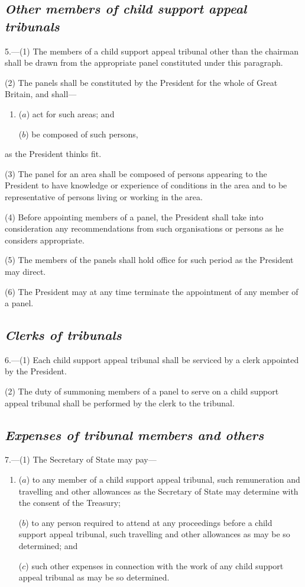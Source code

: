 \documentclass[12pt,a4paper]{article}
\begin{document}
\subsection*{\itshape Other members of child support appeal tribunals}

5.---(1) The members of a child support appeal tribunal other than the chairman shall be drawn from the appropriate panel constituted under this paragraph.

(2) The panels shall be constituted by the President for the whole of Great Britain, and shall—
\begin{enumerate}\item[]
($a$) act for such areas; and

($b$) be composed of such persons,
\end{enumerate}
as the President thinks fit.

(3) The panel for an area shall be composed of persons appearing to the President to have knowledge or experience of conditions in the area and to be representative of persons living or working in the area.

(4) Before appointing members of a panel, the President shall take into consideration any recommendations from such organisations or persons as he considers appropriate.

(5) The members of the panels shall hold office for such period as the President may direct.

(6) The President may at any time terminate the appointment of any member of a panel.

\subsection*{\itshape Clerks of tribunals}

6.---(1) Each child support appeal tribunal shall be serviced by a clerk appointed by the President.

(2) The duty of summoning members of a panel to serve on a child support appeal tribunal shall be performed by the clerk to the tribunal.

\subsection*{\itshape Expenses of tribunal members and others}

7.---(1) The Secretary of State may pay—
\begin{enumerate}\item[]
($a$) to any member of a child support appeal tribunal, such remuneration and travelling and other allowances as the Secretary of State may determine with the consent of the Treasury;

($b$) to any person required to attend at any proceedings before a child support appeal tribunal, such travelling and other allowances as may be so determined; and

($c$) such other expenses in connection with the work of any child support appeal tribunal as may be so determined.
\end{enumerate}
\end{document}
